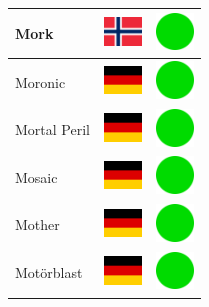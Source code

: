 \documentclass[12pt, a4paper, twoside]{report}
\begin{document}
\begin{center}
\begin{longtable}{|p{5cm}|p{2cm}|p{2cm}|}
 Mork                                                       & \includegraphics[width=1cm]{../img/flags/no} &   \includegraphics[width=1cm]{../likes/y} \\ \hline
 Moronic                                                    & \includegraphics[width=1cm]{../img/flags/de} &   \includegraphics[width=1cm]{../likes/y} \\ \hline
 Mortal Peril                                               & \includegraphics[width=1cm]{../img/flags/de} &   \includegraphics[width=1cm]{../likes/y} \\ \hline
 Mosaic                                                     & \includegraphics[width=1cm]{../img/flags/de} &   \includegraphics[width=1cm]{../likes/y} \\ \hline
 Mother                                                     & \includegraphics[width=1cm]{../img/flags/de} &   \includegraphics[width=1cm]{../likes/y} \\ \hline
 Motörblast                                                 & \includegraphics[width=1cm]{../img/flags/de} &   \includegraphics[width=1cm]{../likes/y} \\ \hline

\end{longtable}
\end{center}
\end{document}
